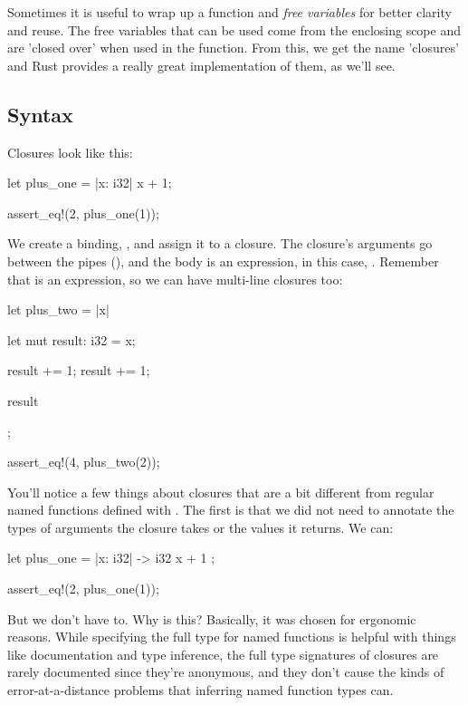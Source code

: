 Sometimes it is useful to wrap up a function and \emph{free variables} for better clarity and reuse. The free variables that can be used 
come from the enclosing scope and are 'closed over' when used in the function. From this, we get the name 'closures' and Rust provides a 
really great implementation of them, as we'll see.

\subsection*{Syntax}

Closures look like this:

\begin{rustc}
let plus_one = |x: i32| x + 1;

assert_eq!(2, plus_one(1));
\end{rustc}

We create a binding, , and assign it to a closure. The closure's arguments go between the pipes (\code{|}), and the body 
is an expression, in this case, . Remember that \code{\{ \}} is an expression, so we can have multi-line closures too:

\begin{rustc}
let plus_two = |x| {
    let mut result: i32 = x;

    result += 1;
    result += 1;

    result
};

assert_eq!(4, plus_two(2));
\end{rustc}

You'll notice a few things about closures that are a bit different from regular named functions defined with . The first is that 
we did not need to annotate the types of arguments the closure takes or the values it returns. We can:

\begin{rustc}
let plus_one = |x: i32| -> i32 { x + 1 };

assert_eq!(2, plus_one(1));
\end{rustc}

But we don't have to. Why is this? Basically, it was chosen for ergonomic reasons. While specifying the full type for named functions 
is helpful with things like documentation and type inference, the full type signatures of closures are rarely documented since they're 
anonymous, and they don't cause the kinds of error-at-a-distance problems that inferring named function types can.

\blank


